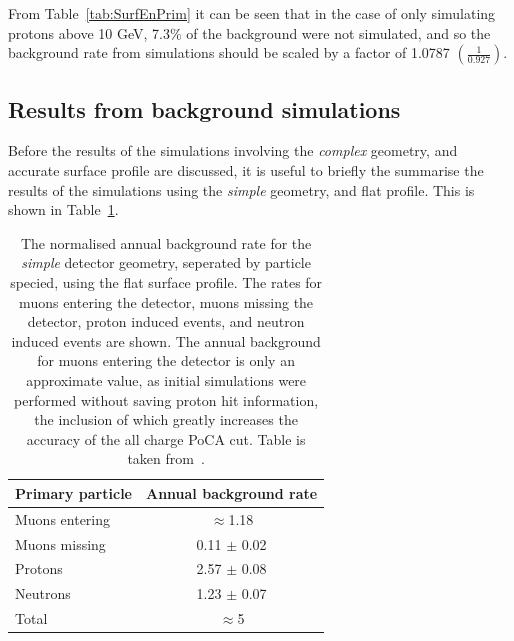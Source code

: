 From Table~\ref{tab:SurfEnPrim} it can be seen that in the case of only simulating protons above 10 GeV, 7.3\% of the background were not simulated, and so the background rate from simulations should be scaled by a factor of 1.0787 $\left(\frac{1}{0.927}\right)$. \\

\subsection{Results from background simulations}
Before the results of the simulations involving the \emph{complex} geometry, and accurate surface profile are discussed, it is useful to briefly the summarise the results of the simulations using the \emph{simple} geometry, and flat profile. This is shown in Table~\ref{tab:SimpSurfRates}. \\
\begin{table}
  \caption[The normalised annual background rate for the \emph{simple} detector geometry, using the flat surface profile]
          {The normalised annual background rate for the \emph{simple} detector geometry, seperated by particle specied, using the flat surface profile. The rates for muons entering the detector, muons missing the detector, proton induced events, and neutron induced events are shown. The annual background for muons entering the detector is only an approximate value, as initial simulations were performed without saving proton hit information, the inclusion of which greatly increases the accuracy of the all charge PoCA cut. Table is taken from~\citep{MartinsThesis}.}
  \centering
  \label{tab:SimpSurfRates}
  \begin{tabular}{l c}
    \toprule
        {Primary particle} & {Annual background rate}  \\ 
        \midrule
        Muons entering     & $\approx$1.18             \\

        Muons missing      & 0.11 $\pm$ 0.02           \\

        Protons            & 2.57 $\pm$ 0.08           \\

        Neutrons           & 1.23 $\pm$ 0.07           \\

        Total              & $\approx$5                \\
    \bottomrule
  \end{tabular}
\end{table}

